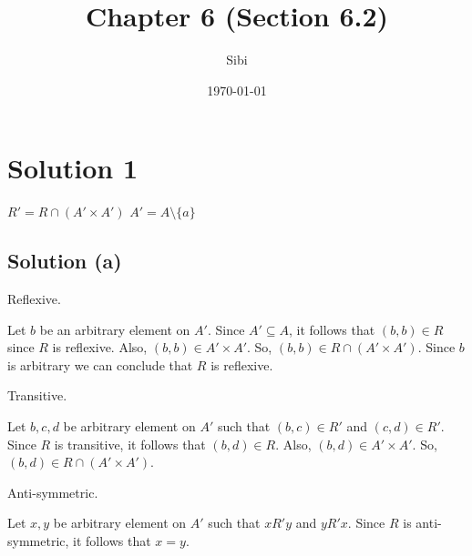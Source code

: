 \documentclass{article}
\begin{document}
\title{Chapter 6 (Section 6.2)}
\author{Sibi}
\date{\today}
\maketitle

\DeclarePairedDelimiter\abs{\lvert}{\rvert}%
\DeclarePairedDelimiter\norm{\lVert}{\rVert}%

\makeatletter
\let\oldabs\abs
\def\abs{\@ifstar{\oldabs}{\oldabs*}}
%
\let\oldnorm\norm
\def\norm{\@ifstar{\oldnorm}{\oldnorm*}}
\makeatother
\newpage

\section{Solution 1}


$R' = R \cap (A' \times A')$
$A' = A \setminus \{a\}$

\subsection{Solution (a)}
Reflexive.

Let $b$ be an arbitrary element on $A'$. Since $A' \subseteq A$, it
follows that $(b,b) \in R$ since $R$ is reflexive. Also,
$(b,b) \in A' \times A'$. So, $(b,b) \in R \cap (A' \times A')$. Since
$b$ is arbitrary we can conclude that $R$ is reflexive.

Transitive.

Let $b,c,d$ be arbitrary element on $A'$ such that $(b,c) \in R'$ and
$(c,d) \in R'$. Since $R$ is transitive, it follows that
$(b,d) \in R$. Also, $(b,d) \in A' \times A'$. So,
$(b,d) \in R \cap (A' \times A')$.

Anti-symmetric.

Let $x,y$ be arbitrary element on $A'$ such that $xR'y$ and $yR'x$.
Since $R$ is anti-symmetric, it follows that $x=y$.
\end{document}
